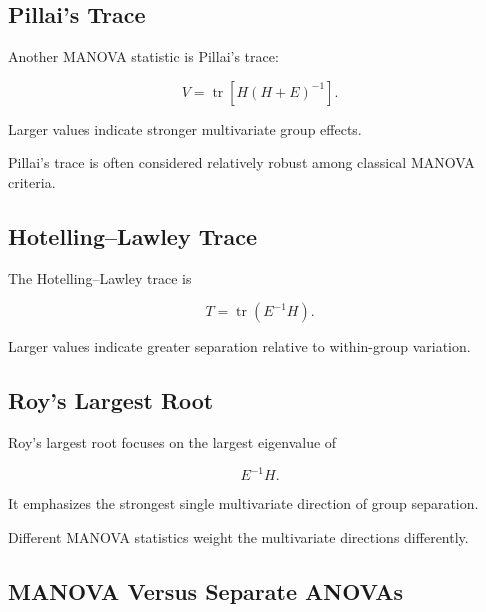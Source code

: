 \subsection{Pillai's Trace}
\label{subsec:pillais-trace}

Another MANOVA statistic is Pillai's trace:

\[
\boxed{
V
=
\operatorname{tr}
\left[
H(H+E)^{-1}
\right].
}
\]

Larger values indicate stronger multivariate group effects.

Pillai's trace is often considered relatively robust among classical
MANOVA criteria.

\subsection{Hotelling--Lawley Trace}
\label{subsec:hotelling-lawley-trace}

The Hotelling--Lawley trace is

\[
\boxed{
T
=
\operatorname{tr}
(
E^{-1}H
).
}
\]

Larger values indicate greater separation relative to within-group
variation.

\subsection{Roy's Largest Root}
\label{subsec:roys-largest-root}

Roy's largest root focuses on the largest eigenvalue of

\[
\boxed{
E^{-1}H.
}
\]

It emphasizes the strongest single multivariate direction of group
separation.

Different MANOVA statistics weight the multivariate directions
differently.

\subsection{MANOVA Versus Separate ANOVAs}
\label{subsec:manova-versus-anovas}

